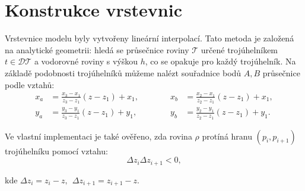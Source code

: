 \section*{Konstrukce vrstevnic}
\par Vrstevnice modelu byly vytvořeny lineární interpolací. Tato metoda je založená na analytické geometrii: hledá se průsečnice roviny $\mathcal{T}$ určené trojúhelníkem $t \in \mathcal{DT}$ a vodorovné roviny s výškou $h$, co se opakuje pro každý trojúhelník. Na základě podobnosti trojúhelníků můžeme nalézt souřadnice bodů $A, B$ průsečnice podle vztahů:
\begin{equation*}
\begin{split}
    x_a & = \frac{x_3-x_1}{z_3-z_1}(z-z_1)+x_1,\\[10pt]
    y_a & = \frac{y_3-y_1}{z_3-z_1}(z-z_1)+y_1,
\end{split}
\quad \quad \quad
\begin{split}
    x_b & = \frac{x_2-x_1}{z_2-z_1}(z-z_1)+x_1,\\[10pt]
    y_b & = \frac{y_2-y_1}{z_2-z_1}(z-z_1)+y_1.
\end{split}
\end{equation*}
\par Ve vlastní implementaci je také ověřeno, zda rovina $\rho$ protíná hranu $(p_i, p_{i+1})$ trojúhelníku pomocí vztahu:
\begin{equation*}
    \Delta z_i\Delta z_{i+1} < 0,
\end{equation*}
\par kde $\Delta z_i = z_i - z, \: \: \Delta z_{i+1} = z_{i+1} - z$.
\bigbreak
